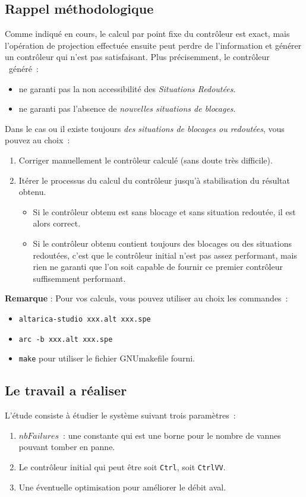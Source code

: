 \subsection{Rappel méthodologique}
Comme indiqué en cours, le calcul par point fixe du contrôleur est exact, mais l'opération de projection effectuée ensuite peut perdre de l'information et générer un contrôleur qui n'est pas satisfaisant. Plus précisemment, le contrôleur \altarica\ généré~:
\begin{itemize}
\item ne garanti pas la non accessibilité des \emph{Situations Redoutées}.
\item ne garanti pas l'absence de \emph{nouvelles situations de blocages}.
\end{itemize}

Dans le cas ou il existe toujours \emph{des situations de blocages ou redoutées}, vous pouvez au choix~:
\begin{enumerate}
\item Corriger manuellement le contrôleur calculé (sans doute très difficile).
\item Itérer le processus du calcul du contrôleur jusqu'à stabilisation du résultat obtenu. 
  \begin{itemize}
  \item Si le contrôleur obtenu est sans blocage et sans situation redoutée, il est alors correct.
  \item Si le contrôleur obtenu contient toujours des blocages ou des situations redoutées, c'est que le contrôleur initial n'est pas assez performant, mais rien ne garanti que l'on soit capable de fournir ce premier contrôleur suffisemment performant.
  \end{itemize}
\end{enumerate}

{\bf Remarque} : Pour vos calculs, vous pouvez utiliser au choix les commandes~:
\begin{itemize}
\item {\tt altarica-studio xxx.alt xxx.spe}
\item {\tt arc -b xxx.alt xxx.spe}
\item {\tt make} pour utiliser le fichier GNUmakefile fourni.
\end{itemize}

\subsection{Le travail a réaliser}
L'étude consiste à étudier le système suivant trois paramètres~:
\begin{enumerate}
\item $nbFailures$~: une constante qui est une borne pour le nombre de vannes pouvant tomber en panne.
\item Le contrôleur initial qui peut être soit {\tt Ctrl}, soit {\tt CtrlVV}.
\item Une éventuelle optimisation pour améliorer le débit aval.
\end{enumerate}

